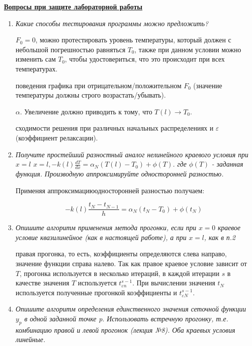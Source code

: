 \underline{\textbf{Вопросы при защите лабораторной работы}}\\
\begin{enumerate}
\item \textit{Какие способы тестирования программы можно предложить?}

 $F_0 = 0$, можно протестировать уровень температуры, который должен с небольшой погрешностью равняться $T_0$, также при данном условии можно изменить сам $T_0$, чтобы удостовериться, что это происходит при всех температурах.

 поведения графика при отрицательном/положительном $F_0$ (значение температуры должны строго возрастать/убывать).

 $\alpha$. Увеличение должно приводить к тому, что $T(l) \rightarrow T_0$.

 сходимости решения при различных начальных распределениях и $\varepsilon$ (коэффициент релаксации).

\item \textit{Получите простейший разностный аналог нелинейного краевого условия при $x = l$
$x = l, -k(l)\frac{dT}{dx} = \alpha_N(T(l) - T_0) + \phi(T).$
где $\phi(T)$ - заданная функция.
Производную аппроксимируйте односторонней разностью.}

Применяя аппроксимациюодносторонней разностью получаем:

\begin{equation}
	-k(l)\dfrac{t_N - t_{N-1}}{h} = \alpha_N(t_N - T_0) + \phi(t_N)
\end{equation}

\item \textit{Опишите алгоритм применения метода прогонки, если при $x = 0$ краевое условие квазилинейное (как в настоящей работе), а при $x = l$, как в п.2}

 правая прогонка, то есть, коэффициенты определяются слева направо, значение функции справа налево. Так как правое краевое условие зависит от $T$, прогонка используется в несколько итераций, в каждой итерации $s$ в качестве значения $T$ используется $t_{\varepsilon n}^{s-1}$. При вычислении значения $t_N$ используется полученные прогонкой коэффициенты и $t_{\varepsilon N}^{s-1}$. 

\item  \textit{Опишите алгоритм определения единственного значения сеточной функции $y_p$ в одной заданной точке p. Использовать встречную прогонку, т.е. комбинацию правой и левой прогонок (лекция №8). Оба краевых условия линейные.}


\end{enumerate}
